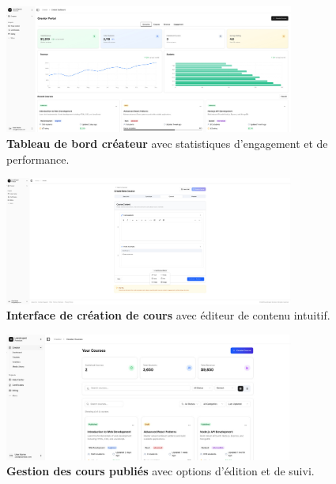 \begin{figure}[h!]
  \centering
  \includegraphics[width=0.85\textwidth,keepaspectratio]{old-reports/week_4_img/cdash.jpeg}
  \caption{\textbf{Tableau de bord créateur} avec statistiques d'engagement et de performance.}
  \label{fig:creator_dashboard}
\end{figure}

\begin{figure}[h!]
  \centering
  \includegraphics[width=0.85\textwidth,keepaspectratio]{old-reports/week_4_img/create_course.jpeg}
  \caption{\textbf{Interface de création de cours} avec éditeur de contenu intuitif.}
  \label{fig:course_creator}
\end{figure}

\begin{figure}[h!]
  \centering
  \includegraphics[width=0.85\textwidth,keepaspectratio]{old-reports/week_4_img/your_courses.jpeg}
  \caption{\textbf{Gestion des cours publiés} avec options d'édition et de suivi.}
  \label{fig:courses_management}
\end{figure}

